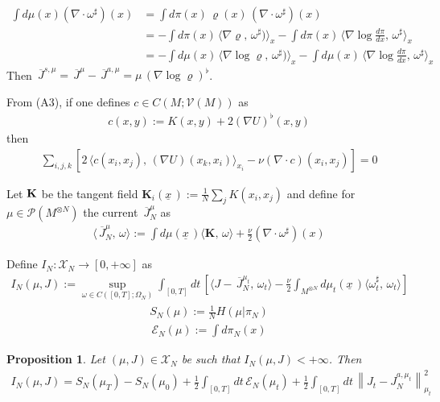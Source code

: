 \documentclass[reqno]{amsart}
\newtheorem{proposition}[theorem]{Proposition}
\newtheorem{remark}[theorem]{Remark}
\numberwithin{equation}{section}
\numberwithin{theorem}{section}
\newcommand{\mc}[1]{{\mathcal #1}}
\newcommand{\mb}[1]{{\mathbf #1}}
\newcommand{\upbar}[1]{\,\overline{\! #1}}
\newcommand{\downbar}[1]{\underline{#1\!}\,}
\newcommand{\bel}[2]{\begin{equation} \label{#1} \begin{split} #2
 \end{split} \end{equation}}
\newcommand{\dangle}[2]{\langle #1,\,#2 \rangle}
\newcommand{\comment}[1]{
\par\noindent
\colorbox{light}{\begin{minipage}{120 mm}#1\end{minipage}}
\par\noindent
}
\newcommand{\undx}{\downbar{x}}
\newcommand{\visc}{\nu}
\begin{document}
\comment{
\bel{e:conto1}{
\int d\mu(x)  (\nabla \cdot \omega^\sharp)(x) 
& =\int d\pi(x) \, \varrho(x)\, (\nabla \cdot \omega^\sharp)(x)
\\
& =-\int d\pi(x) \, \dangle{\nabla \varrho}{\omega^\sharp)}_x
	-\int d\pi(x)\,\dangle{\nabla \log \frac{d\pi}{dx}}{\omega^\sharp}_x
\\
& =-\int d\mu(x) \, \dangle{\nabla \log \varrho}{\omega^\sharp)}_x
	-\int d\mu(x)\,\dangle{\nabla \log \frac{d\pi}{dx}}{\omega^\sharp}_x
}
Then $\upbar J^{s,\mu}=\upbar J^{\mu}-\upbar J^{a,\mu}=\mu\,\left(\nabla \log \varrho\right)^\flat$.

From (A3), if one defines $c\in C(M;\mc V(M))$ as
\bel{e:kdec1}{
c(x,y):=K(x,y)+2 (\nabla U)^\flat(x,y)
}
then
\bel{e:ort1}{
\sum_{i,j,k} \left[2\,\dangle{c(x_i,x_j)}{(\nabla U)(x_k,x_i)}_{x_i}-\visc (\nabla \cdot c)(x_i,x_j)\right]=0
}
}

\newpage



Let $\bf K$ be the tangent field $\mb K_i(\undx):=\tfrac 1N \sum_{j} K(x_i,x_j)$ and define for $\mu\in \mc P(M^{\otimes N})$ the current $\upbar J_N^\mu$ as
\bel{e:jntyp}{
\dangle{\upbar J_N^\mu}{\omega}:= \int d\mu(\undx) \dangle{\mb K}{\omega} + \frac{\nu}2 (\nabla \cdot \omega^\sharp)(x)
}

Define $I_N \colon \mc X_N \to [0,+\infty]$ as
\bel{e:in1}{
I_N(\mu,J):= \sup_{\omega \in C([0,T];\Omega_N)} \int_{[0,T]}dt\,
\left[
\dangle{J-\upbar J_N^{\mu_t}}{\omega_t}-\tfrac{\visc}2 \int_{M^{\otimes N}} d\mu_t(\undx) 
\dangle{\omega_t^\sharp}{\omega_t} 
\right]
}
\bel{e:entn}{
S_N(\mu):=\frac 1N H(\mu|\pi_N)
}
\bel{e:diricn}{
\mc E_N(\mu):=\int d\pi_N(x)
}


\begin{proposition}
\label{p:decn}
Let $(\mu,J)\in \mc X_N$ be such that $I_N(\mu,J)<+\infty$. Then
\bel{e:decn}{
I_N(\mu,J)= S_N(\mu_T)-S_N(\mu_0)+\tfrac 12 \int_{[0,T]}dt\,\mc E_N(\mu_t)
+\tfrac 12 \int_{[0,T]}dt\,
 \left\|J_t-J^{a,\mu_t}_N\right\|_{\mu_t}^2
}



\end{proposition}


\end{document}
